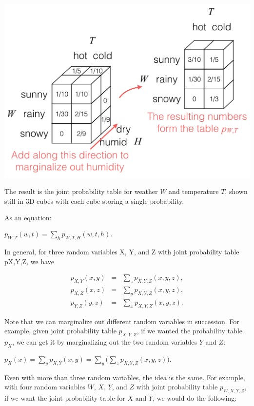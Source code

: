 \documentclass[6008notes.tex]{subfiles}
\begin{document}
{\centering\includegraphics[scale=0.4]{images_sec-joint-rv-marg-many-rv-marg} \par}

The result is the joint probability table for weather $W$ and temperature $T$, shown still in 3D cubes with each cube storing a single probability.

As an equation:

{\centering$p_{W,T}(w,t) = \sum _ h p_{W,T,H}(w, t, h).$ \par}
 
In general, for three random variables X, Y, and Z with joint probability table pX,Y,Z, we have

\begin{eqnarray*}
p_{X,Y}(x,y)
&=&
\sum_{z} p_{X,Y,Z}(x,y,z), \\
p_{X,Z}(x,z)
&=&
\sum_{y} p_{X,Y,Z}(x,y,z), \\
p_{Y,Z}(y,z)
&=&
\sum_{x} p_{X,Y,Z}(x,y,z).
\end{eqnarray*}

Note that we can marginalize out different random variables in succession. For example, given joint probability table $p_{X,Y,Z}$, if we wanted the probability table $p_X$, we can get it by marginalizing out the two random variables $Y$ and $Z$:

{\centering$p_ X(x) = \sum _{y} p_{X,Y}(x,y) = \sum _{y} \Big( \sum _{z} p_{X,Y,Z}(x,y,z) \Big).$ \par}
 
Even with more than three random variables, the idea is the same. For example, with four random variables $W$, $X$, $Y$, and $Z$ with joint probability table $p_{W,X,Y,Z}$, if we want the joint probability table for $X$ and $Y$, we would do the following:
\end{document}
